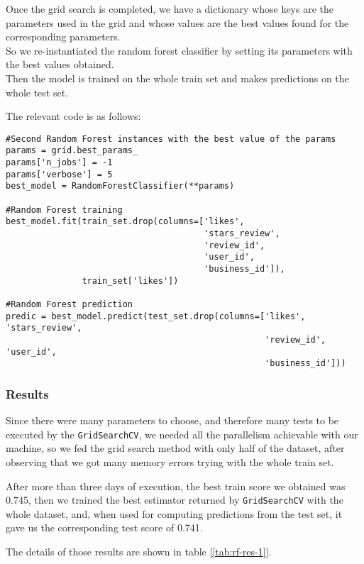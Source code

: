 Once the grid search is completed, we have a dictionary whose keys are the parameters used in the grid and whose values are the best values found for the corresponding parameters.\\
So we re-instantiated the random forest classifier by setting its parameters with the best values obtained.\\
Then the model is trained on the whole train set and makes predictions on the whole test set.

The relevant code is as follows:

\begin{lstlisting}[caption={Random Forest training and predictions}, label={lst:rf-fit}]
#Second Random Forest instances with the best value of the params
params = grid.best_params_
params['n_jobs'] = -1
params['verbose'] = 5
best_model = RandomForestClassifier(**params)

#Random Forest training
best_model.fit(train_set.drop(columns=['likes', 
                                       'stars_review', 
                                       'review_id', 
                                       'user_id', 
                                       'business_id']),
               train_set['likes'])

#Random Forest prediction 
predic = best_model.predict(test_set.drop(columns=['likes', 'stars_review',
                                                   'review_id', 'user_id', 
                                                   'business_id']))
\end{lstlisting}


\subsubsection{Results}

Since there were many parameters to choose, and therefore many tests to be executed by the \texttt{GridSearchCV}, we needed all the parallelism achievable with our machine, so we fed the grid search method with only half of the dataset, after observing that we got many memory errors trying with the whole train set.

After more than three days of execution, the best train score we obtained was 0.745, then we trained the best estimator returned by \texttt{GridSearchCV} with the whole dataset, and, when used for computing predictions from the test set, it gave us the corresponding test score of 0.741.

The details of those results are shown in table [\ref{tab:rf-res-1}].


